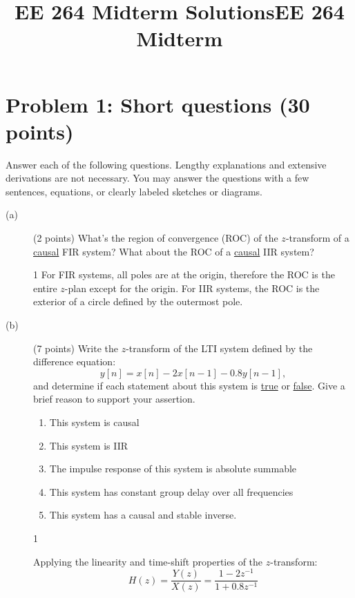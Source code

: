 \documentclass[10pt]{article}
\title{EE 264 Midterm Solutions}
\title{EE 264 Midterm}
\def\SOLUTIONS{1} %
\def\SolutionsColor{red2}
\begin{document}

\pagebreak

\section*{Problem 1: Short questions (30 points)}

Answer each of the following questions. Lengthy explanations and extensive derivations are not necessary. You may answer the questions with a few sentences, equations, or clearly labeled sketches or diagrams.

\begin{description}
\item[(a)] (2 points) What's the region of convergence (ROC) of the $z$-transform of a \underline{causal} FIR system? What about the ROC of a \underline{causal} IIR system? 

\if\SOLUTIONS1
{\color{\SolutionsColor} For FIR systems, all poles are at the origin, therefore the ROC is the entire $z$-plan except for the origin. For IIR systems, the ROC is the exterior of a circle defined by the outermost pole.
}
\else\vspace{3cm}
\fi

%
\item[(b)] (7 points) Write the $z$-transform of the LTI system defined by the difference equation:
\begin{equation}
y[n] = x[n] - 2x[n-1] - 0.8y[n-1],
\end{equation}
and determine if each statement about this system is \underline{true} or \underline{false}. Give a brief reason to support your assertion.

\begin{enumerate}\setlength\itemsep{2em}
  \item This system is causal
  \item This system is IIR
  \item The impulse response of this system is absolute summable
  \item This system has constant group delay over all frequencies
  \item This system has a causal and stable inverse.
\end{enumerate}

\if\SOLUTIONS1
{\color{\SolutionsColor} Applying the linearity and time-shift properties of the $z$-transform:
\begin{equation*}
H(z) = \frac{Y(z)}{X(z)} = \frac{1 - 2z^{-1}}{1 + 0.8z^{-1}}
\end{equation*}

}
\end{description}
\end{document}
